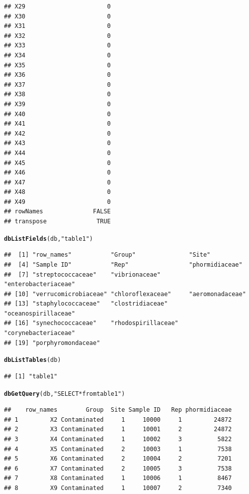 \documentclass[10pt,handout,english]{beamer}\usepackage[]{graphicx}\usepackage[]{color}
\makeatletter
\newcommand{\hlstr}[1]{\textcolor[rgb]{0.192,0.494,0.8}{#1}}%
\newcommand{\hlstd}[1]{\textcolor[rgb]{0.345,0.345,0.345}{#1}}%
\newcommand{\hlkwd}[1]{\textcolor[rgb]{0.737,0.353,0.396}{\textbf{#1}}}%
\newenvironment{kframe}{%
 \def\at@end@of@kframe{}%
 \ifinner\ifhmode%
  \def\at@end@of@kframe{\end{minipage}}%
  \begin{minipage}{\columnwidth}%
 \fi\fi%
 \def\FrameCommand##1{\hskip\@totalleftmargin \hskip-\fboxsep
 \colorbox{shadecolor}{##1}\hskip-\fboxsep
     \hskip-\linewidth \hskip-\@totalleftmargin \hskip\columnwidth}%
 \MakeFramed {\advance\hsize-\width
   \@totalleftmargin\z@ \linewidth\hsize
   \@setminipage}}%
 {\par\unskip\endMakeFramed%
 \at@end@of@kframe}
\newenvironment{knitrout}{}{} %
\makeatother
\begin{document}
\begin{frame}[fragile]
\begin{knitrout}
\begin{kframe}
\begin{verbatim}
## X29                       0
## X30                       0
## X31                       0
## X32                       0
## X33                       0
## X34                       0
## X35                       0
## X36                       0
## X37                       0
## X38                       0
## X39                       0
## X40                       0
## X41                       0
## X42                       0
## X43                       0
## X44                       0
## X45                       0
## X46                       0
## X47                       0
## X48                       0
## X49                       0
## rowNames              FALSE
## transpose              TRUE
\end{verbatim}
\begin{alltt}
\hlkwd{dbListFields}\hlstd{(db,}\hlstr{"table1"}\hlstd{)}
\end{alltt}
\begin{verbatim}
##  [1] "row_names"           "Group"               "Site"               
##  [4] "Sample ID"           "Rep"                 "phormidiaceae"      
##  [7] "streptococcaceae"    "vibrionaceae"        "enterobacteriaceae" 
## [10] "verrucomicrobiaceae" "chloroflexaceae"     "aeromonadaceae"     
## [13] "staphylococcaceae"   "clostridiaceae"      "oceanospirillaceae" 
## [16] "synechococcaceae"    "rhodospirillaceae"   "corynebacteriaceae" 
## [19] "porphyromondaceae"
\end{verbatim}
\begin{alltt}
\hlkwd{dbListTables}\hlstd{(db)}
\end{alltt}
\begin{verbatim}
## [1] "table1"
\end{verbatim}
\begin{alltt}
\hlkwd{dbGetQuery}\hlstd{(db,} \hlstr{"SELECT * from table1"}\hlstd{)}
\end{alltt}
\begin{verbatim}
##    row_names        Group  Site Sample ID   Rep phormidiaceae
## 1         X2 Contaminated     1     10000     1         24872
## 2         X3 Contaminated     1     10001     2         24872
## 3         X4 Contaminated     1     10002     3          5822
## 4         X5 Contaminated     2     10003     1          7538
## 5         X6 Contaminated     2     10004     2          7201
## 6         X7 Contaminated     2     10005     3          7538
## 7         X8 Contaminated     1     10006     1          8467
## 8         X9 Contaminated     1     10007     2          7340

\end{verbatim}
\end{kframe}
\end{knitrout}
\end{frame}
\end{document}
